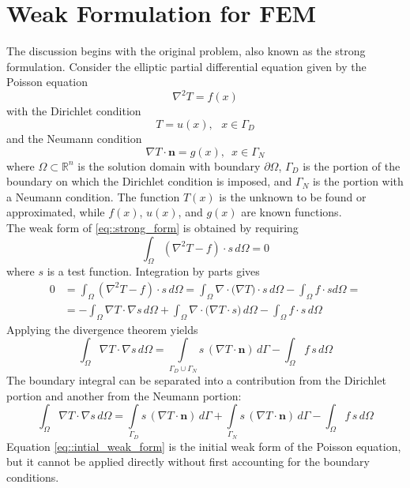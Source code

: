 \documentclass[a4paper]{article}
\begin{document}
\section{Weak Formulation for FEM}
The discussion begins with the original problem, also known as the strong formulation. Consider the elliptic partial differential equation given by the Poisson equation
\begin{equation}\label{eq::strong_form}
\nabla^2 T= f(x)
\end{equation}
with the Dirichlet condition
\begin{equation}
T=u(x), \,\,\,\,x\in \Gamma_D
\end{equation}
and the Neumann condition
\begin{equation}
\nabla T \cdot \mathbf{n}=g(x),\,\,\,x\in \Gamma_N
\end{equation}
where $\Omega\subset\mathbb{R}^n$ is the solution domain with boundary $\partial\Omega$, $\Gamma_D$ is the portion of the boundary on which the Dirichlet condition is imposed, and $\Gamma_N$ is the portion with a Neumann condition. The function $T(x)$ is the unknown to be found or approximated, while $f(x)$, $u(x)$, and $g(x)$ are known functions.\\
The weak form of \ref{eq::strong_form} is obtained by requiring
\begin{equation}
\int_{\Omega}(\nabla^2 T -f)\cdot s\, d\Omega=0
\end{equation}
where $s$ is a test function. Integration by parts gives
\begin{equation}
\begin{aligned}
0&=\int_{\Omega}(\nabla^2 T -f)\cdot s\, d\Omega=\int_{\Omega}\nabla\cdot\big( \nabla T \big)\cdot s\, d\Omega-\int_{\Omega}f\cdot s d\Omega=\\
&=-\int_{\Omega}\nabla T \cdot \nabla s \,d\Omega + \int_{\Omega}\nabla\cdot\big(\nabla T \cdot s  \big)\,d\Omega-\int_{\Omega} f\cdot s\, d\Omega
\end{aligned}
\end{equation}
Applying the divergence theorem yields
\begin{equation}
\int_{\Omega}\nabla T \cdot \nabla s\,d\Omega = \int\limits_{\Gamma_D \cup \Gamma_N} s\,(\nabla T\cdot \mathbf{n})\,d\Gamma-\int_{\Omega}f\,s\,d\Omega
\end{equation}
The boundary integral can be separated into a contribution from the Dirichlet portion and another from the Neumann portion:
\begin{equation}\label{eq::intial_weak_form}
\int_{\Omega}\nabla T \cdot \nabla s\, d\Omega = \int\limits_{\Gamma_D} s\,(\nabla T\cdot \mathbf{n})\, d\Gamma+\int\limits_{\Gamma_N} s\,(\nabla T\cdot \mathbf{n})\, d\Gamma-\int_{\Omega}f\,s\, d\Omega
\end{equation}
Equation \ref{eq::intial_weak_form} is the initial weak form of the Poisson equation, but it cannot be applied directly without first accounting for the boundary conditions.
\end{document}
